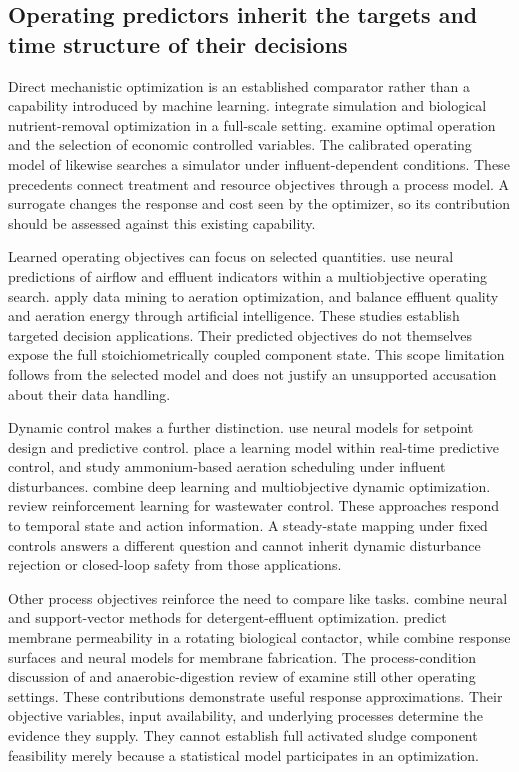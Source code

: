 \subsection{Operating predictors inherit the targets and time structure of their decisions}

Direct mechanistic optimization is an established comparator rather than a capability introduced by machine learning. \citet{Fang2011} integrate simulation and biological nutrient-removal optimization in a full-scale setting. \citet{Araujo2013} examine optimal operation and the selection of economic controlled variables. The calibrated operating model of \citet{Nazif2023} likewise searches a simulator under influent-dependent conditions. These precedents connect treatment and resource objectives through a process model. A surrogate changes the response and cost seen by the optimizer, so its contribution should be assessed against this existing capability.

Learned operating objectives can focus on selected quantities. \citet{KusiakWei2013} use neural predictions of airflow and effluent indicators within a multiobjective operating search. \citet{Asadi2017} apply data mining to aeration optimization, and \citet{Mao2024} balance effluent quality and aeration energy through artificial intelligence. These studies establish targeted decision applications. Their predicted objectives do not themselves expose the full stoichiometrically coupled component state. This scope limitation follows from the selected model and does not justify an unsupported accusation about their data handling.

Dynamic control makes a further distinction. \citet{Sadeghassadi2018} use neural models for setpoint design and predictive control. \citet{Bernardelli2020} place a learning model within real-time predictive control, and \citet{Ren2026} study ammonium-based aeration scheduling under influent disturbances. \citet{Niu2022} combine deep learning and multiobjective dynamic optimization. \citet{Croll2023} review reinforcement learning for wastewater control. These approaches respond to temporal state and action information. A steady-state mapping under fixed controls answers a different question and cannot inherit dynamic disturbance rejection or closed-loop safety from those applications.

Other process objectives reinforce the need to compare like tasks. \citet{Jana2022} combine neural and support-vector methods for detergent-effluent optimization. \citet{Waqas2022} predict membrane permeability in a rotating biological contactor, while \citet{Li2022} combine response surfaces and neural models for membrane fabrication. The process-condition discussion of \citet{Shojaei2021} and anaerobic-digestion review of \citet{Poh2016} examine still other operating settings. These contributions demonstrate useful response approximations. Their objective variables, input availability, and underlying processes determine the evidence they supply. They cannot establish full activated sludge component feasibility merely because a statistical model participates in an optimization.

